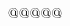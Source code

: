 $$\def\makeacc@#1#2{\def#1{\mathaccent"\accentclass@#2 }}
\makeacc@\hat{05E}
\makeacc@\check{014}
\makeacc@\tilde{07E}
\makeacc@\acute{013}
\makeacc@\grave{012}
\makeacc@\dot{05F}
\makeacc@\ddot{07F}
\makeacc@\breve{015}
\makeacc@\bar{016}
\def\vec{\mathaccent"017E }
\newcount\skewcharcount@
\newcount\familycount@
\def\theskewchar@{\familycount@\@ne
 \global\skewcharcount@\the\skewchar\textfont\@ne                           %
 \ifnum\fam>\m@ne\ifnum\fam<16
  \global\familycount@\the\fam\relax
  \global\skewcharcount@\the\skewchar\textfont\the\fam\relax\fi\fi          %
 \ifnum\skewcharcount@>\m@ne
  \ifnum\skewcharcount@<128
  \multiply\familycount@256
  \global\advance\skewcharcount@\familycount@
  \global\advance\skewcharcount@28672
  \mathchar\skewcharcount@\else
  \global\skewcharcount@\m@ne\fi\else
 \global\skewcharcount@\m@ne\fi}                                            %
\newcount\pointcount@
\def\getpoints@#1.#2\getpoints@{\pointcount@#1 }
\newdimen\accentdimen@
\newcount\accentmu@
\def\dimentomu@{\multiply\accentdimen@ 100
 \expandafter\getpoints@\the\accentdimen@\getpoints@
 \multiply\pointcount@18
 \divide\pointcount@\@m
 \global\accentmu@\pointcount@}
\def\Makeacc@#1#2{\def#1{\RIfM@\DN@{\mathaccent@
 {"\accentclass@#2 }}\else\DN@{\nonmatherr@{#1}}\fi\next@}}
\def\unbracefonts@{\let\Cal@\Cal@@\let\roman@\roman@@\let\bold@\bold@@
 \let\slanted@\slanted@@}
\def\mathaccent@#1#2{\ifnum\fam=\m@ne\xdef\thefam@{1}\else
 \xdef\thefam@{\the\fam}\fi                                                 %
 \accentdimen@\z@                                                           %
 \setboxz@h{\unbracefonts@$\m@th\fam\thefam@\relax#2$}%
 \ifdim\accentdimen@=\z@\DN@{\mathaccent#1{#2}}%
  \setbox@ne\hbox{\unbracefonts@$\m@th\fam\thefam@\relax#2\theskewchar@$}%
  \setbox\tw@\hbox{$\m@th\ifnum\skewcharcount@=\m@ne\else
   \mathchar\skewcharcount@\fi$}%
  \global\accentdimen@\wd@ne\global\advance\accentdimen@-\wdz@
  \global\advance\accentdimen@-\wd\tw@                                     %
  \global\multiply\accentdimen@\tw@
  \dimentomu@\global\advance\accentmu@\@ne                                 %
 \else\DN@{{\mathaccent#1{#2\mkern\accentmu@ mu}%
    \mkern-\accentmu@ mu}{}}\fi                                             %
 \next@}\Makeacc@\Hat{05E}
\Makeacc@\Check{014}
\Makeacc@\Tilde{07E}
\Makeacc@\Acute{013}
\Makeacc@\Grave{012}
\Makeacc@\Dot{05F}
\Makeacc@\Ddot{07F}
\Makeacc@\Breve{015}
\Makeacc@\Bar{016}
\def\Vec{\RIfM@\DN@{\mathaccent@{"017E }}\else
}$$
